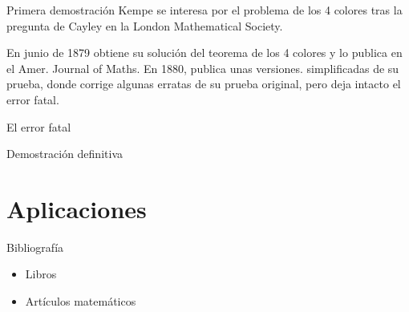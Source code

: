 \documentclass[spanish,utf8]{beamer}
\begin{document}
\begin{frame}{\insertsection}\transblindsvertical
\begin{block}{Primera demostración}
Kempe se interesa por el problema de los 4 colores tras la pregunta de Cayley en la London Mathematical Society.
\end{block}

\begin{block}{}
En junio de 1879 obtiene su solución del teorema de los 4 colores y lo publica en el Amer. Journal of Maths. En 1880, publica unas versiones. simplificadas de su prueba, donde corrige algunas erratas de su prueba original, pero deja intacto el error fatal.
\end{block}
    \end{frame}

\begin{frame}{\insertsection}\transblindsvertical
El error fatal
\end{frame}

\begin{frame}{\insertsection}\transblindsvertical
Demostración definitiva
\end{frame}

\section{Aplicaciones}
\begin{frame}{\insertsection}\transblindsvertical

\end{frame}


\begin{frame}{Bibliografía}\transblindsvertical
\begin{itemize}
	\item Libros
	\nocite{*}
	\printbibliography[prefixnumbers=FC, heading=none,keyword=book]
	\item Artículos matemáticos
	\printbibliography[prefixnumbers=SC, heading=none,keyword=paper]
\end{itemize}
\end{frame}
\end{document}
